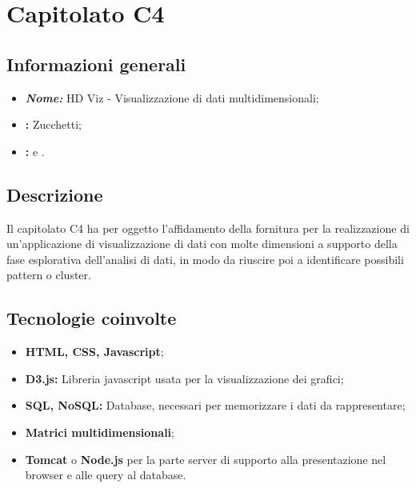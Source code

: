 \section{Capitolato C4}

\subsection{Informazioni generali}
\begin{itemize}
\item \textbf{\emph{Nome:}} HD Viz - Visualizzazione di dati multidimensionali;
\item \textbf{\commitProg:} Zucchetti;
\item \textbf{\proponProg:} \VT{} e \CR.
\end{itemize}

\subsection{Descrizione}
Il capitolato C4 ha per oggetto l’affidamento della fornitura per la realizzazione di un'applicazione di visualizzazione di dati con molte dimensioni a supporto della fase esplorativa dell'analisi di dati, in modo da riuscire poi a identificare possibili pattern o cluster.

\subsection{Tecnologie coinvolte}
\begin{itemize}
\item \textbf{HTML, CSS, Javascript};
\item \textbf{D3.js:} Libreria javascript usata per la visualizzazione dei grafici;
\item \textbf{SQL, NoSQL:} Database, necessari per memorizzare i dati da rappresentare;
\item \textbf{Matrici multidimensionali};
\item \textbf{Tomcat} o \textbf{Node.js} per la parte server di supporto alla presentazione nel browser e alle query al database.
\end{itemize}

